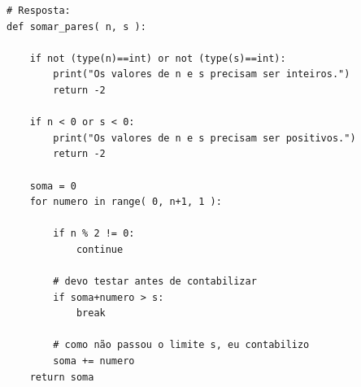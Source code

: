 \ifmostrarGabarito
\begin{verbatim}
# Resposta:
def somar_pares( n, s ):

    if not (type(n)==int) or not (type(s)==int):
        print("Os valores de n e s precisam ser inteiros.")
        return -2
        
    if n < 0 or s < 0:
        print("Os valores de n e s precisam ser positivos.")
        return -2

    soma = 0
    for numero in range( 0, n+1, 1 ):

        if n % 2 != 0:
            continue
            
        # devo testar antes de contabilizar
        if soma+numero > s:
            break

        # como não passou o limite s, eu contabilizo
        soma += numero
    return soma        

\end{verbatim}
\fi
